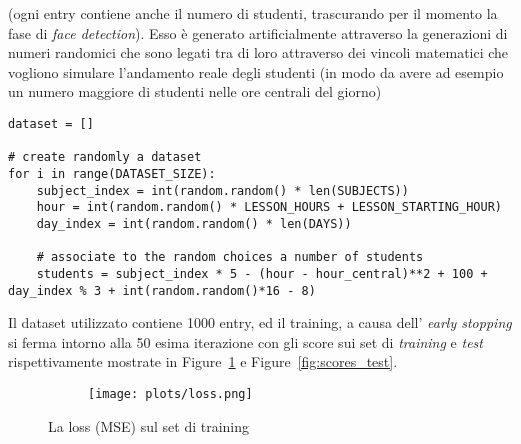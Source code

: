 \noindent
(ogni entry contiene anche il numero di studenti, trascurando per il momento la 
fase di \textit{face detection}). Esso è generato artificialmente attraverso la generazioni 
di numeri randomici che sono legati tra di loro attraverso dei vincoli matematici che vogliono 
simulare l'andamento reale degli studenti (in modo da avere ad esempio un numero maggiore di 
studenti nelle ore centrali del giorno)

\begin{verbatim}
dataset = []

# create randomly a dataset
for i in range(DATASET_SIZE):
    subject_index = int(random.random() * len(SUBJECTS))
    hour = int(random.random() * LESSON_HOURS + LESSON_STARTING_HOUR)
    day_index = int(random.random() * len(DAYS))

    # associate to the random choices a number of students
    students = subject_index * 5 - (hour - hour_central)**2 + 100 + day_index % 3 + int(random.random()*16 - 8)
\end{verbatim}

Il dataset utilizzato contiene 1000 entry, ed il training, a causa dell'
\textit{early stopping} si ferma intorno alla 50 esima iterazione con gli 
score sui set di \textit{training} e \textit{test} rispettivamente mostrate in 
Figure~\ref{fig:scores_training} e Figure~\ref{fig:scores_test}.

\smallskip

\begin{figure}[h]
    \centering
    
    \begin{subfigure}[b]{0.6\linewidth}
        \texttt{[image: plots/loss.png]}
    \end{subfigure}
    \caption{La loss (MSE) sul set di training}
    \label{fig:scores_training}
\end{figure}

